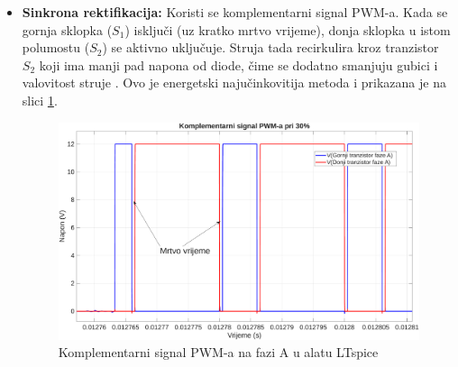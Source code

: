 \documentclass[diplomskirad, upload]{fer}
\begin{document}
\begin{itemize}
\begin{itemize}
		      \item \textbf{Sinkrona rektifikacija:} Koristi se komplementarni signal
		            PWM-a. Kada se gornja sklopka ($S_1$) isključi (uz kratko mrtvo
		            vrijeme), donja sklopka u istom polumostu ($S_2$) se aktivno uključuje.
		            Struja tada recirkulira kroz tranzistor $S_2$ koji ima manji pad napona
		            od diode, čime se dodatno smanjuju gubici i valovitost struje \cite{TI2015}. Ovo je
		            energetski najučinkovitija metoda i prikazana je na slici
		            \ref{fig:comp_pwm}.
		            \begin{figure}[h!]
			            \centering
			            \includegraphics[width=\textwidth]{csv/comp_ltspice.pdf}
			            \caption{Komplementarni signal PWM-a na fazi A u alatu LTspice}
			            \label{fig:comp_pwm}
		            \end{figure}

	      \end{itemize}
\end{itemize}
\end{document}
